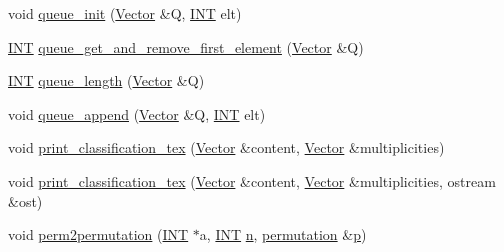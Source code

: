 \begin{DoxyCompactItemize}
\item 
void \mbox{\hyperlink{global_8_c_a5fc0dec58681e5be05ad2041d536a7b7}{queue\+\_\+init}} (\mbox{\hyperlink{class_vector}{Vector}} \&Q, \mbox{\hyperlink{galois_8h_a09fddde158a3a20bd2dcadb609de11dc}{I\+NT}} elt)
\item 
\mbox{\hyperlink{galois_8h_a09fddde158a3a20bd2dcadb609de11dc}{I\+NT}} \mbox{\hyperlink{global_8_c_a05fee7461fa2dfe60afe724f9c14a0d4}{queue\+\_\+get\+\_\+and\+\_\+remove\+\_\+first\+\_\+element}} (\mbox{\hyperlink{class_vector}{Vector}} \&Q)
\item 
\mbox{\hyperlink{galois_8h_a09fddde158a3a20bd2dcadb609de11dc}{I\+NT}} \mbox{\hyperlink{global_8_c_a261831dc194cc41110fb4d7050632c6a}{queue\+\_\+length}} (\mbox{\hyperlink{class_vector}{Vector}} \&Q)
\item 
void \mbox{\hyperlink{global_8_c_a7c7ad0546f30e1acd13a686f79c38df5}{queue\+\_\+append}} (\mbox{\hyperlink{class_vector}{Vector}} \&Q, \mbox{\hyperlink{galois_8h_a09fddde158a3a20bd2dcadb609de11dc}{I\+NT}} elt)
\item 
void \mbox{\hyperlink{global_8_c_aefba9d715816fdc37563d5e6b16b25e9}{print\+\_\+classification\+\_\+tex}} (\mbox{\hyperlink{class_vector}{Vector}} \&content, \mbox{\hyperlink{class_vector}{Vector}} \&multiplicities)
\item 
void \mbox{\hyperlink{global_8_c_ad0e10e12298c81bc55cda3583f480659}{print\+\_\+classification\+\_\+tex}} (\mbox{\hyperlink{class_vector}{Vector}} \&content, \mbox{\hyperlink{class_vector}{Vector}} \&multiplicities, ostream \&ost)
\item 
void \mbox{\hyperlink{global_8_c_ad063a496206583f8db8cd8c31e2cc536}{perm2permutation}} (\mbox{\hyperlink{galois_8h_a09fddde158a3a20bd2dcadb609de11dc}{I\+NT}} $\ast$a, \mbox{\hyperlink{galois_8h_a09fddde158a3a20bd2dcadb609de11dc}{I\+NT}} \mbox{\hyperlink{simeon_8_c_a7f2cd26777ce0ff3fdaf8d02aacbddfb}{n}}, \mbox{\hyperlink{classpermutation}{permutation}} \&\mbox{\hyperlink{alphabet2_8_c_a533391314665d6bf1b5575e9a9cd8552}{p}})
\item 

\end{DoxyCompactItemize}
